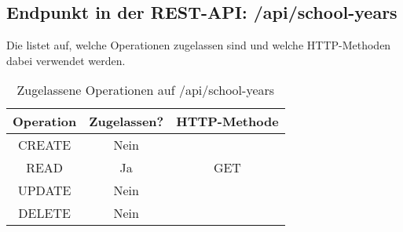 \subsection{Endpunkt in der REST-API: /api/school-years}
\label{sec:end:rest:api:school-years}
Die  listet auf, welche Operationen zugelassen sind und welche HTTP-Methoden dabei verwendet werden. 

\begin{table}[!htbp]
	\begin{tabular}{|c|c|c|}
		\hline
			\textbf{Operation} & \textbf{Zugelassen?} & \textbf{HTTP-Methode} \\ \hline
			CREATE & Nein & \\ \hline 
			READ & Ja & GET \\ \hline
			UPDATE & Nein & \\ \hline 
			DELETE & Nein & \\ \hline
	\end{tabular}

		\caption{Zugelassene Operationen auf /api/school-years}
		\label{tab:end:rest:api:school_years:meth}
\end{table}
